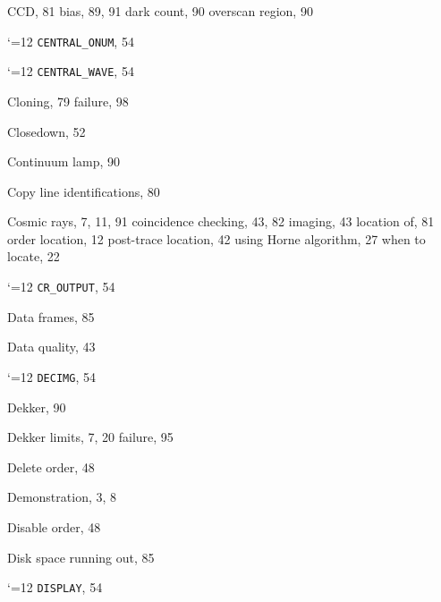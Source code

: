 \documentclass[twoside,11pt]{article}
\renewcommand{\_}{\texttt{\symbol{95}}}
\newcommand{\cmdname}{\begingroup \catcode`\_=12 \realcmdname}
\newcommand{\realcmdname}[1]{\endgroup\texttt{#1}}
\newcommand{\cmdname}[1]{#1}
\begin{document}
\begin{theindex}
  \indexspace

  \item CCD, 81
    \subitem bias, 89, 91
    \subitem dark count, 90
    \subitem overscan region, 90
  \item \cmdname {CENTRAL_ONUM}, 54
  \item \cmdname {CENTRAL_WAVE}, 54
  \item Cloning, 79
    \subitem failure, 98
  \item Closedown, 52
  \item Continuum lamp, 90
  \item Copy line identifications, 80
  \item Cosmic rays, 7, 11, 91
    \subitem coincidence checking, 43, 82
    \subitem imaging, 43
    \subitem location of, 81
    \subitem order location, 12
    \subitem post-trace location, 42
    \subitem using Horne algorithm, 27
    \subitem when to locate, 22
  \item \cmdname {CR_OUTPUT}, 54

  \indexspace

  \item Data frames, 85
  \item Data quality, 43
  \item \cmdname {DECIMG}, 54
  \item Dekker, 90
  \item Dekker limits, 7, 20
    \subitem failure, 95
  \item Delete order, 48
  \item Demonstration, 3, 8
  \item Disable order, 48
  \item Disk space
    \subitem running out, 85
  \item \cmdname {DISPLAY}, 54

  \indexspace


\end{theindex}
\end{document}
